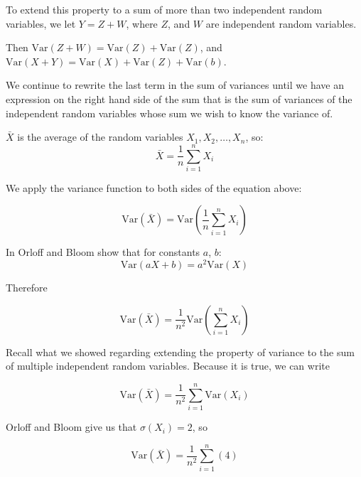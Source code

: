 \documentclass[a4paper,11pt]{article}
\begin{document}
To extend this property to a sum of more than two independent random variables,
we let $Y=Z+W$, where $Z$, and $W$ are independent random variables.

Then $\text{Var}\left( Z + W \right) = \text{Var}\left( Z \right) +
\text{Var}\left( Z \right)$, and $\text{Var}\left( X + Y\right) =
  \text{Var}\left( X \right) + \text{Var}\left(Z \right)
  + \text{Var}\left(b \right)$.

We continue to rewrite the last term in the sum of variances until we have
an expression on the right hand side of the sum that is the sum of variances
of the independent random variables whose sum we wish to know the variance of.

$\bar{X}$ is the average of the random variables $X_{1}, X_{2}, \ldots, X_{n}$,
so:
\begin{equation}
\bar{X}
  = \frac{1}{n}\sum_{i=1}^{n} X_{i}
\end{equation}

We apply the variance function to both sides of the equation above:


\begin{equation}
\text{Var}\left( \bar{X} \right)
  = \text{Var} \left( \frac{1}{n}\sum_{i=1}^{n} X_{i} \right)
\end{equation}

In \cite{reading5a} Orloff and Bloom show that for constants $a$, $b$:
\begin{equation}
  \text{Var} \left( aX + b \right) = a^{2}\text{Var}\left(X \right)
\end{equation}

Therefore

\begin{equation}
\text{Var}\left( \bar{X} \right)
  = \frac{1}{n^{2}} \text{Var} \left( \sum_{i=1}^{n} X_{i} \right)
\end{equation}

Recall what we showed regarding extending the property of variance to the sum
of multiple independent random variables. Because it is true, we can write

\begin{equation}
\text{Var}\left( \bar{X} \right)
  = \frac{1}{n^{2}} \sum_{i=1}^{n} \text{Var} \left( X_{i} \right)
\end{equation}

Orloff and Bloom give us that $\sigma(X_{i})=2$, so

\begin{equation}
\text{Var}\left( \bar{X} \right)
  = \frac{1}{n^{2}} \sum_{i=1}^{n} \left( 4 \right)
\end{equation}
\end{document}
